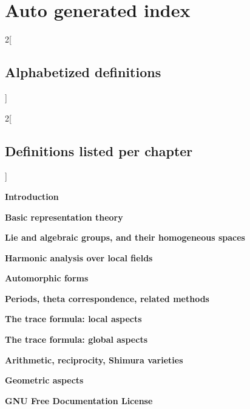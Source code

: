 \documentclass{stacks-project-book}
\theoremstyle{plain}
\theoremstyle{definition}
\theoremstyle{remark}
\numberwithin{equation}{subsection}
\begin{document}
\chapter{Auto generated index}

\label{index-section-phantom}


\frenchspacing


\begin{multicols}{2}[\section{Alphabetized definitions}\label{index-section-alphabetized}]
\end{multicols}

\begin{multicols}{2}[\section{Definitions listed per chapter}\label{index-section-per-chapter}]

\medskip\noindent
{\bf Introduction}

\medskip

\medskip\noindent
{\bf Basic representation theory}

\medskip

\medskip\noindent
{\bf Lie and algebraic groups, and their homogeneous spaces}

\medskip

\medskip\noindent
{\bf Harmonic analysis over local fields}

\medskip

\medskip\noindent
{\bf Automorphic forms}

\medskip

\medskip\noindent
{\bf Periods, theta correspondence, related methods}

\medskip

\medskip\noindent
{\bf The trace formula: local aspects}

\medskip

\medskip\noindent
{\bf The trace formula: global aspects}

\medskip

\medskip\noindent
{\bf Arithmetic, reciprocity, Shimura varieties}

\medskip

\medskip\noindent
{\bf Geometric aspects}

\medskip

\medskip\noindent
{\bf GNU Free Documentation License}

\medskip
\end{multicols}
\end{document}
